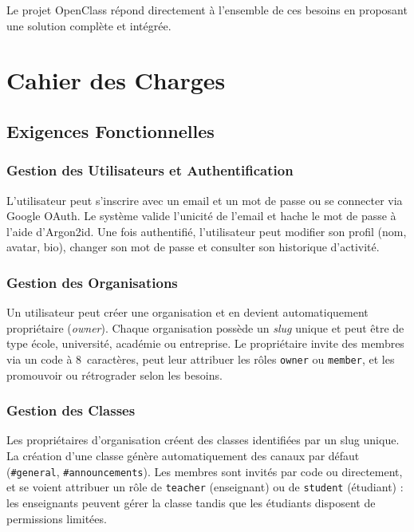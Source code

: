 \documentclass[12pt, a4paper, twoside]{report}
\begin{document}
Le projet OpenClass répond directement à l'ensemble de ces besoins en proposant
une solution complète et intégrée.

\chapter{Cahier des Charges}

\section{Exigences Fonctionnelles}

\subsection{Gestion des Utilisateurs et Authentification}

L'utilisateur peut s'inscrire avec un email et un mot de passe ou se connecter
via Google OAuth. Le système valide l'unicité de l'email et hache le mot de passe
à l'aide d'Argon2id. Une fois authentifié, l'utilisateur peut modifier son profil
(nom, avatar, bio), changer son mot de passe et consulter son historique d'activité.

\subsection{Gestion des Organisations}

Un utilisateur peut créer une organisation et en devient automatiquement
propriétaire (\textit{owner}). Chaque organisation possède un \textit{slug}
unique et peut être de type école, université, académie ou entreprise. Le
propriétaire invite des membres via un code à 8~caractères, peut leur attribuer
les rôles \texttt{owner} ou \texttt{member}, et les promouvoir ou rétrograder
selon les besoins.

\subsection{Gestion des Classes}

Les propriétaires d'organisation créent des classes identifiées par un slug
unique. La création d'une classe génère automatiquement des canaux par défaut
(\texttt{\#general}, \texttt{\#announcements}). Les membres sont invités par code
ou directement, et se voient attribuer un rôle de \texttt{teacher} (enseignant)
ou de \texttt{student} (étudiant) : les enseignants peuvent gérer la classe tandis
que les étudiants disposent de permissions limitées.
\end{document}
